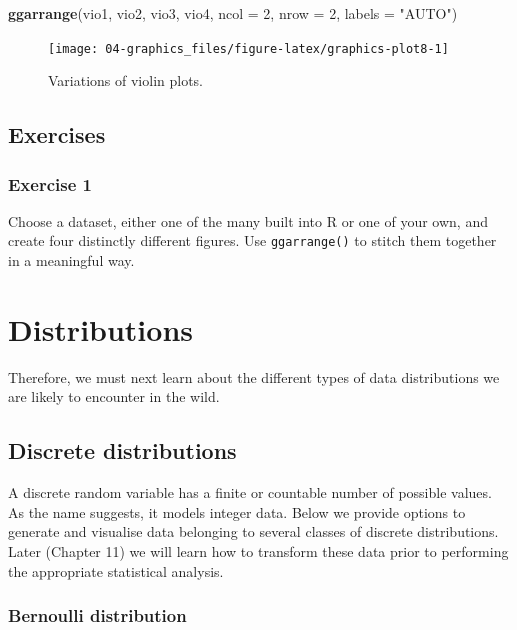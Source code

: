 \documentclass[english,10pt,a4paper,oneside]{book}
\newenvironment{Shaded}{\begin{snugshade}}{\end{snugshade}}
\newcommand{\KeywordTok}[1]{\textcolor[rgb]{0.13,0.29,0.53}{\textbf{#1}}}
\newcommand{\DataTypeTok}[1]{\textcolor[rgb]{0.13,0.29,0.53}{#1}}
\newcommand{\DecValTok}[1]{\textcolor[rgb]{0.00,0.00,0.81}{#1}}
\newcommand{\StringTok}[1]{\textcolor[rgb]{0.31,0.60,0.02}{#1}}
\newcommand{\NormalTok}[1]{#1}
\theoremstyle{definition}
\theoremstyle{definition}
\theoremstyle{definition}
\theoremstyle{remark}
\begin{document}
\begin{Shaded}
\begin{Highlighting}[]
\KeywordTok{ggarrange}\NormalTok{(vio1, vio2, vio3, vio4, }\DataTypeTok{ncol =} \DecValTok{2}\NormalTok{, }\DataTypeTok{nrow =} \DecValTok{2}\NormalTok{, }\DataTypeTok{labels =} \StringTok{"AUTO"}\NormalTok{)}
\end{Highlighting}
\end{Shaded}

\begin{figure}
\texttt{[image: 04-graphics\_files/figure-latex/graphics-plot8-1]} \caption{Variations of violin plots.}\label{fig:graphics-plot8}
\end{figure}

\section{Exercises}\label{exercises-1}

\subsection{Exercise 1}\label{exercise-1-1}

Choose a dataset, either one of the many built into R or one of your
own, and create four distinctly different figures. Use
\texttt{ggarrange()} to stitch them together in a meaningful way.

\chapter{Distributions}\label{distributions}

Therefore, we must next learn about the different types of data
distributions we are likely to encounter in the wild.

\section{Discrete distributions}\label{discrete-distributions}

A discrete random variable has a finite or countable number of possible
values. As the name suggests, it models integer data. Below we provide
options to generate and visualise data belonging to several classes of
discrete distributions. Later (Chapter 11) we will learn how to
transform these data prior to performing the appropriate statistical
analysis.

\subsection{Bernoulli distribution}\label{bernoulli-distribution}
\end{document}
